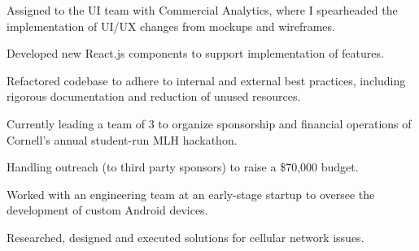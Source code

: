 \documentclass[]{deedy-resume-openfont}
\begin{document}
\begin{minipage}[t]{0.66\textwidth}
\begin{tightemize}
\item Assigned to the UI team with Commercial Analytics, where I spearheaded the implementation of UI/UX changes from mockups and wireframes.
\item Developed new React.js components to support implementation of features.
\item Refactored codebase to adhere to internal and external best practices, including rigorous documentation and reduction of unused resources.
\end{tightemize}
\sectionsep
{}
\begin{tightemize}
\item Currently leading a team of 3 to organize sponsorship and financial operations of Cornell's annual student-run MLH hackathon.
\item Handling outreach (to third party sponsors) to raise a \$70,000 budget.
\end{tightemize}

\begin{tightemize}
\item Worked with an engineering team at an early-stage startup to oversee the development of custom Android devices.
\item Researched, designed and executed solutions for cellular network issues.
\end{tightemize}
\sectionsep



\end{minipage}
\end{document}
